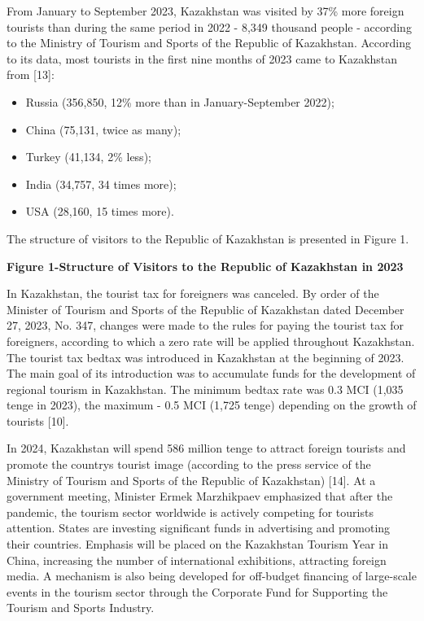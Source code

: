 From January to September 2023, Kazakhstan was visited by 37\% more
foreign tourists than during the same period in 2022 - 8,349 thousand
people - according to the Ministry of Tourism and Sports of the Republic
of Kazakhstan. According to its data, most tourists in the first nine
months of 2023 came to Kazakhstan from {[}13{]}:

\begin{itemize}
\item
  Russia (356,850, 12\% more than in January-September 2022);
\item
  China (75,131, twice as many);
\item
  Turkey (41,134, 2\% less);
\item
  India (34,757, 34 times more);
\item
  USA (28,160, 15 times more).
\end{itemize}

The structure of visitors to the Republic of Kazakhstan is presented in
Figure 1.

{\bfseries Figure 1-Structure of Visitors to the Republic of Kazakhstan in
2023}

In Kazakhstan, the tourist tax for foreigners was canceled. By order of
the Minister of Tourism and Sports of the Republic of Kazakhstan dated
December 27, 2023, No. 347, changes were made to the rules for paying
the tourist tax for foreigners, according to which a zero rate will be
applied throughout Kazakhstan. The tourist tax bedtax was introduced in
Kazakhstan at the beginning of 2023. The main goal of its introduction
was to accumulate funds for the development of regional tourism in
Kazakhstan. The minimum bedtax rate was 0.3 MCI (1,035 tenge in 2023),
the maximum - 0.5 MCI (1,725 tenge) depending on the growth of tourists
{[}10{]}.

In 2024, Kazakhstan will spend 586 million tenge to attract foreign
tourists and promote the country\textquotesingle s tourist image
(according to the press service of the Ministry of Tourism and Sports of
the Republic of Kazakhstan) {[}14{]}. At a government meeting, Minister
Ermek Marzhikpaev emphasized that after the pandemic, the tourism sector
worldwide is actively competing for tourists\textquotesingle{}
attention. States are investing significant funds in advertising and
promoting their countries. Emphasis will be placed on the Kazakhstan
Tourism Year in China, increasing the number of international
exhibitions, attracting foreign media. A mechanism is also being
developed for off-budget financing of large-scale events in the tourism
sector through the Corporate Fund for Supporting the Tourism and Sports
Industry.

